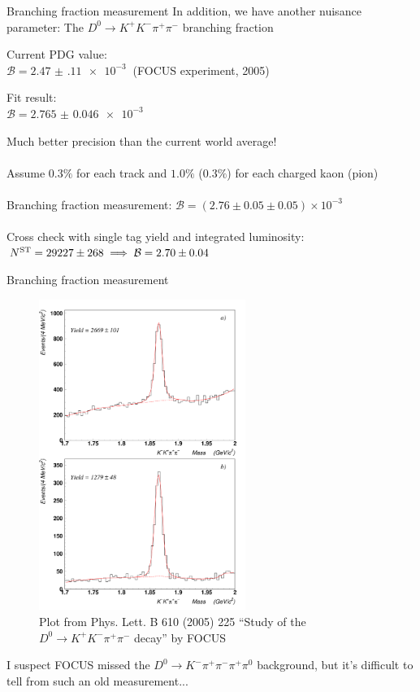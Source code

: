 \documentclass{beamer}
\begin{document}
\begin{frame}{Branching fraction measurement}
  \vspace{0.0cm}
  {\Large In addition, we have another nuisance parameter: The $D^0\to K^+K^-\pi^+\pi^-$ branching fraction\\}
  \begin{center}
    Current PDG value:\\
    $\mathcal{B} = \SI{2.47(11)e-3}{}$ (FOCUS experiment, 2005)
  \end{center}
  \vspace{-0.5cm}
  \begin{center}
    Fit result:\\
    $\mathcal{B} = \SI{2.765(46)e-3}{}$
  \end{center}
  Much better precision than the current world average!\\~\\
  Assume $0.3\%$ for each track and $1.0\%$ ($0.3\%$) for each charged kaon (pion)\\~\\
  Branching fraction measurement: $\mathcal{B} = (2.76 \pm 0.05 \pm 0.05)\times 10^{-3}$\\~\\
  Cross check with single tag yield and integrated luminosity: $N^{\rm ST} = 29227 \pm 268\implies \mathcal{B} = 2.70 \pm 0.04$
\end{frame}

\begin{frame}{Branching fraction measurement}
  \begin{figure}
    \includegraphics[width=0.6\textwidth,trim={0 30cm 0 0},clip=true]{Plots/KKpipi_Focus.pdf}
    \caption{Plot from Phys. Lett. B 610 (2005) 225 ``Study of the $D^0\to K^+K^-\pi^+\pi^-$ decay'' by FOCUS}
  \end{figure}
  \vspace{-0.5cm}
  I suspect FOCUS missed the $D^0\to K^-\pi^+\pi^-\pi^+\pi^0$ background, but it's difficult to tell from such an old measurement...
\end{frame}
\end{document}
